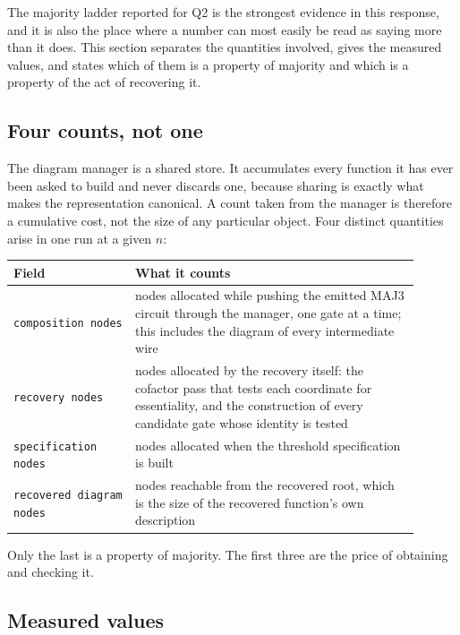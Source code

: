 \documentclass[11pt,a4paper]{article}
\begin{document}
The majority ladder reported for Q2 is the strongest evidence in this response,
and it is also the place where a number can most easily be read as saying more
than it does. This section separates the quantities involved, gives the
measured values, and states which of them is a property of majority and which
is a property of the act of recovering it.

\subsection{Four counts, not one}

The diagram manager is a shared store. It accumulates every function it has
ever been asked to build and never discards one, because sharing is exactly
what makes the representation canonical. A count taken from the manager is
therefore a cumulative cost, not the size of any particular object. Four
distinct quantities arise in one run at a given $n$:

\begin{center}
\begin{tabular}{p{0.27\linewidth}p{0.63\linewidth}}
\toprule
Field & What it counts\\\midrule
\texttt{composition nodes} & nodes allocated while pushing the
emitted MAJ3 circuit through the manager, one gate at a time; this includes the
diagram of every intermediate wire\\
\texttt{recovery nodes} & nodes allocated by the recovery itself: the
cofactor pass that tests each coordinate for essentiality, and the
construction of every candidate gate whose identity is tested\\
\texttt{specification nodes} & nodes allocated when the threshold
specification is built\\
\texttt{recovered diagram nodes} & nodes reachable from the
recovered root, which is the size of the recovered function's own description\\
\bottomrule
\end{tabular}
\end{center}

Only the last is a property of majority. The first three are the price of
obtaining and checking it.

\subsection{Measured values}
\end{document}
